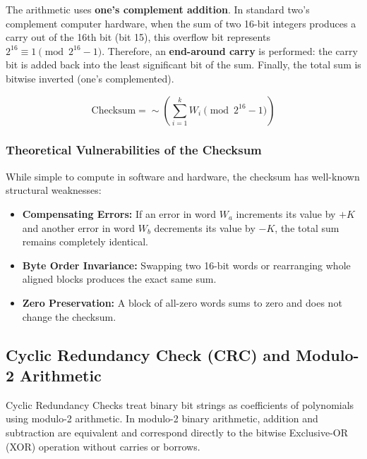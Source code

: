 \documentclass[12pt,a4paper]{article}
\begin{document}
The arithmetic uses \textbf{one's complement addition}. In standard two's complement computer hardware, when the sum of two 16-bit integers produces a carry out of the 16th bit (bit 15), this overflow bit represents $2^{16} \equiv 1 \pmod{2^{16}-1}$. Therefore, an \textbf{end-around carry} is performed: the carry bit is added back into the least significant bit of the sum. Finally, the total sum is bitwise inverted (one's complemented).

\begin{equation}
    \text{Checksum} = \sim \left( \sum_{i=1}^{k} W_i \pmod{2^{16}-1} \right)
\end{equation}

\subsubsection{Theoretical Vulnerabilities of the Checksum}
While simple to compute in software and hardware, the checksum has well-known structural weaknesses:
\begin{itemize}[leftmargin=*]
    \item \textbf{Compensating Errors:} If an error in word $W_a$ increments its value by $+K$ and another error in word $W_b$ decrements its value by $-K$, the total sum remains completely identical. 
    \item \textbf{Byte Order Invariance:} Swapping two 16-bit words or rearranging whole aligned blocks produces the exact same sum.
    \item \textbf{Zero Preservation:} A block of all-zero words sums to zero and does not change the checksum.
\end{itemize}

\subsection{Cyclic Redundancy Check (CRC) and Modulo-2 Arithmetic}
Cyclic Redundancy Checks treat binary bit strings as coefficients of polynomials using modulo-2 arithmetic. In modulo-2 binary arithmetic, addition and subtraction are equivalent and correspond directly to the bitwise Exclusive-OR (XOR) operation without carries or borrows.
\end{document}
